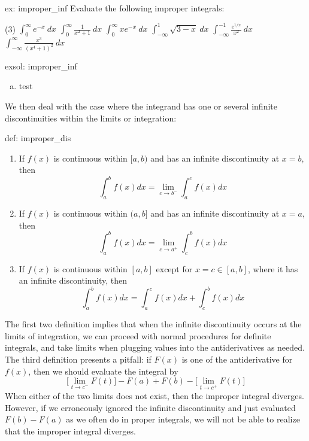 \begin{ex}[]{ex: improper_inf}
    Evaluate the following improper integrals:
    \begin{tasks}(3)
        \task $\int_0^\infty e^{-x}~dx$
        \task $\int_0^\infty \frac{1}{x^2+1}~dx$
        \task $\int_0^\infty xe^{-x}~dx$
        \task $\int_{-\infty}^1 \sqrt{3-x}~dx$
        \task $\int_{-\infty}^{-1} \frac{e^{1/x}}{x^2}~dx$
        \task $\int_{-\infty}^{\infty} \frac{x^3}{(x^4+1)^2}~dx$
    \end{tasks}
\end{ex}

\begin{exsol}[]{exsol: improper_inf}
    \begin{enumerate}[a)]
        \item test
    \end{enumerate}
\end{exsol}

We then deal with the case where the integrand has one or several infinite discontinuities within the limits or integration:

\begin{defi}{def: improper_dis}
    \begin{enumerate}
        \item If $f(x)$ is continuous within $[a, b)$ and has an infinite discontinuity at $x = b$, then
        \[\int_a^b f(x)dx = \lim_{c \rightarrow b^-} \int_a^c f(x)dx\]
        \item If $f(x)$ is continuous within $(a, b]$ and has an infinite discontinuity at $x = a$, then
        \[\int_a^b f(x)dx = \lim_{c \rightarrow a^+} \int_c^b f(x)dx\]
        \item If $f(x)$ is continuous within $[a, b]$ except for $x = c \in [a, b]$, where it has an infinite discontinuity, then
        \[\int_a^b f(x)dx = \int_a^c f(x)dx + \int_c^b f(x)dx\]
    \end{enumerate}
\end{defi}

The first two definition implies that when the infinite discontinuity occurs at the limits of integration, we can proceed with normal procedures for definite integrals, and take limits when plugging values into the antiderivatives as needed.  The third definition presents a pitfall: if $F(x)$ is one of the antiderivative for $f(x)$, then we should evaluate the integral by
\[\big[\lim_{t \rightarrow c^-} F(t)\big] - F(a) + F(b) - \big[\lim_{t \rightarrow c^+} F(t)\big]\]
When either of the two limits does not exist, then the improper integral diverges.  However, if we erroneously ignored the infinite discontinuity and just evaluated $F(b)-F(a)$ as we often do in proper integrals, we will not be able to realize that the improper integral diverges. 

